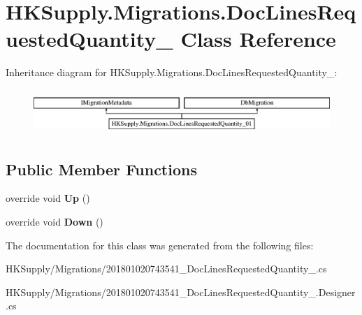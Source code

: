 \hypertarget{class_h_k_supply_1_1_migrations_1_1_doc_lines_requested_quantity__01}{}\section{H\+K\+Supply.\+Migrations.\+Doc\+Lines\+Requested\+Quantity\+\_ Class Reference}
\label{class_h_k_supply_1_1_migrations_1_1_doc_lines_requested_quantity__01}
Inheritance diagram for H\+K\+Supply.\+Migrations.\+Doc\+Lines\+Requested\+Quantity\+\_\+:\begin{figure}[H]
\begin{center}
\leavevmode
\includegraphics[height=1.739130cm]{class_h_k_supply_1_1_migrations_1_1_doc_lines_requested_quantity__01}
\end{center}
\end{figure}
\subsection*{Public Member Functions}
\begin{DoxyCompactItemize}
\item 
\mbox{\label{class_h_k_supply_1_1_migrations_1_1_doc_lines_requested_quantity__01_ad7650b188fd4bf5dc0e1fa52a38a20ee}} 
override void {\bfseries Up} ()
\item 
\mbox{\label{class_h_k_supply_1_1_migrations_1_1_doc_lines_requested_quantity__01_a0f9b9d6cdb08be74625f205b364c1938}} 
override void {\bfseries Down} ()
\end{DoxyCompactItemize}


The documentation for this class was generated from the following files\+:\begin{DoxyCompactItemize}
\item 
H\+K\+Supply/\+Migrations/201801020743541\+\_\+\+Doc\+Lines\+Requested\+Quantity\+\_.\+cs\item 
H\+K\+Supply/\+Migrations/201801020743541\+\_\+\+Doc\+Lines\+Requested\+Quantity\+\_.\+Designer.\+cs\end{DoxyCompactItemize}
